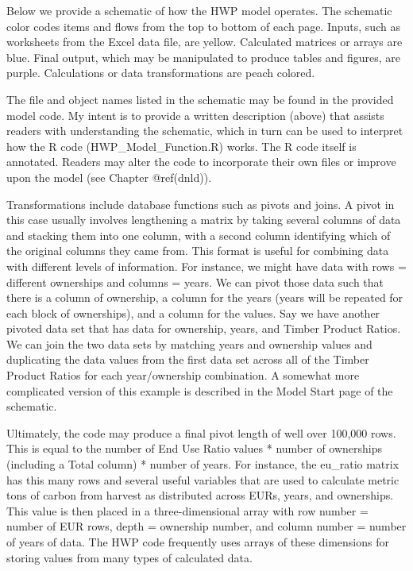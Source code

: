 \documentclass[
  openany]{book}
\begin{document}
Below we provide a schematic of how the HWP model operates. The
schematic color codes items and flows from the top to bottom of each
page. Inputs, such as worksheets from the Excel data file, are yellow.
Calculated matrices or arrays are blue. Final output, which may be
manipulated to produce tables and figures, are purple. Calculations or
data transformations are peach colored.

The file and object names listed in the schematic may be found in the
provided model code. My intent is to provide a written description
(above) that assists readers with understanding the schematic, which in
turn can be used to interpret how the R code (HWP\_Model\_Function.R)
works. The R code itself is annotated. Readers may alter the code to
incorporate their own files or improve upon the model (see Chapter
@ref(dnld)).

Transformations include database functions such as pivots and joins. A
pivot in this case usually involves lengthening a matrix by taking
several columns of data and stacking them into one column, with a second
column identifying which of the original columns they came from. This
format is useful for combining data with different levels of
information. For instance, we might have data with rows = different
ownerships and columns = years. We can pivot those data such that there
is a column of ownership, a column for the years (years will be repeated
for each block of ownerships), and a column for the values. Say we have
another pivoted data set that has data for ownership, years, and Timber
Product Ratios. We can join the two data sets by matching years and
ownership values and duplicating the data values from the first data set
across all of the Timber Product Ratios for each year/ownership
combination. A somewhat more complicated version of this example is
described in the Model Start page of the schematic.

Ultimately, the code may produce a final pivot length of well over
100,000 rows. This is equal to the number of End Use Ratio values *
number of ownerships (including a Total column) * number of years. For
instance, the eu\_ratio matrix has this many rows and several useful
variables that are used to calculate metric tons of carbon from harvest
as distributed across EURs, years, and ownerships. This value is then
placed in a three-dimensional array with row number = number of EUR
rows, depth = ownership number, and column number = number of years of
data. The HWP code frequently uses arrays of these dimensions for
storing values from many types of calculated data.
\end{document}
